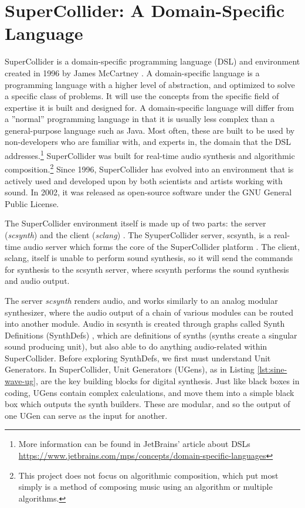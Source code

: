 \section{SuperCollider: A Domain-Specific Language}\label{section:supercollider}

SuperCollider is a domain-specific programming language (DSL) and environment created in 1996 by James McCartney \cite{McCartney_2002}. A domain-specific language is a programming language with a higher level of abstraction, and optimized to solve a specific class of problems. It will use the concepts from the specific field of expertise it is built and designed for. A domain-specific language will differ from a ''normal'' programming language in that it is usually less complex than a general-purpose language such as Java. Most often, these are built to be used by non-developers who are familiar with, and experts in, the domain that the DSL addresses.\footnote{More information can be found in JetBrains' article about DSLs  \url{https://www.jetbrains.com/mps/concepts/domain-specific-languages}} SuperCollider was built for real-time audio synthesis and algorithmic composition.\footnote{This project does not focus on algorithmic composition, which put most simply is a method of composing music using an algorithm or multiple algorithms.} Since 1996, SuperCollider has evolved into an environment that is actively used and developed upon by both scientists and artists working with sound. In 2002, it was released as open-source software under the GNU General Public License.

The SuperCollider environment itself is made up of two parts: the server (\textit{scsynth}) and the client (\textit{sclang}) \cite{McCartney_2002}. The SyuperCollider server, scsynth, is a real-time audio server which forms the core of the SuperCollider platform \cite{McCartney_2021}. The client, sclang, itself is unable to perform sound synthesis, so it will send the commands for synthesis to the scsynth server, where scsynth performs the sound synthesis and audio output.

The server \textit{scsynth} renders audio, and works similarly to an analog modular synthesizer, where the audio output of a chain of various modules can be routed into another module. Audio in scsynth is created through graphs called Synth Definitions (SynthDefs) \cite{McCartney_2002}, which are definitions of synths (synths create a singular sound producing unit), but also able to do anything audio-related within SuperCollider. Before exploring SynthDefs, we first must understand Unit Generators. In SuperCollider, Unit Generators (UGens), as in Listing \ref{lst:sine-wave-ug}, are the key building blocks for digital synthesis. Just like black boxes in coding, UGens contain complex calculations, and move them into a simple black box which outputs the synth builders. These are modular, and so the output of one UGen can serve as the input for another. 

